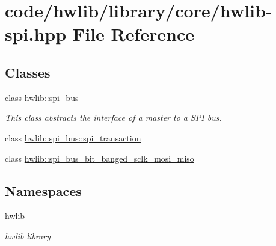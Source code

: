 \hypertarget{hwlib-spi_8hpp}{}\section{code/hwlib/library/core/hwlib-\/spi.hpp File Reference}
\label{hwlib-spi_8hpp}
\subsection*{Classes}
\begin{DoxyCompactItemize}
\item 
class \hyperlink{classhwlib_1_1spi__bus}{hwlib\+::spi\+\_\+bus}
\begin{DoxyCompactList}\small\item\em This class abstracts the interface of a master to a S\+PI bus. \end{DoxyCompactList}\item 
class \hyperlink{classhwlib_1_1spi__bus_1_1spi__transaction}{hwlib\+::spi\+\_\+bus\+::spi\+\_\+transaction}
\item 
class \hyperlink{classhwlib_1_1spi__bus__bit__banged__sclk__mosi__miso}{hwlib\+::spi\+\_\+bus\+\_\+bit\+\_\+banged\+\_\+sclk\+\_\+mosi\+\_\+miso}
\end{DoxyCompactItemize}
\subsection*{Namespaces}
\begin{DoxyCompactItemize}
\item 
 \hyperlink{namespacehwlib}{hwlib}
\begin{DoxyCompactList}\small\item\em hwlib library \end{DoxyCompactList}\end{DoxyCompactItemize}
